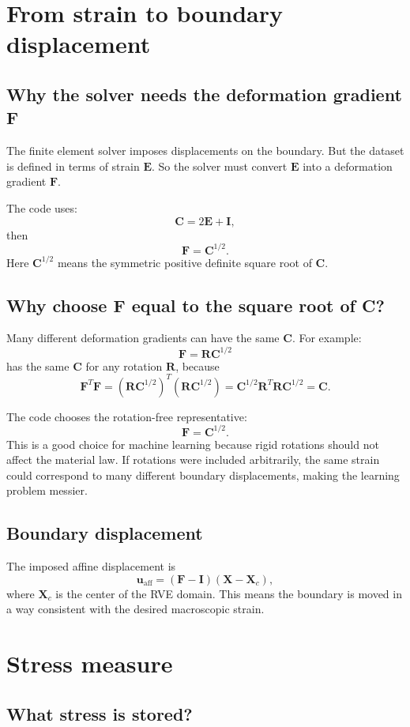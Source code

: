 \documentclass[11pt]{article}
\newcommand{\E}{\bm{E}}
\newcommand{\F}{\bm{F}}
\newcommand{\C}{\bm{C}}
\newcommand{\I}{\bm{I}}
\newcommand{\X}{\bm{X}}
\newcommand{\uvec}{\bm{u}}
\begin{document}
\section{From strain to boundary displacement}

\subsection{Why the solver needs the deformation gradient F}

The finite element solver imposes displacements on the boundary. But the dataset
is defined in terms of strain $\E$. So the solver must convert $\E$ into a
deformation gradient $\F$.

The code uses:
\[
  \C = 2\E + \I,
\]
then
\[
  \F = \C^{1/2}.
\]
Here $\C^{1/2}$ means the symmetric positive definite square root of $\C$.

\subsection{Why choose F equal to the square root of C?}

Many different deformation gradients can have the same $\C$. For example:
\[
  \F = \bm{R}\C^{1/2}
\]
has the same $\C$ for any rotation $\bm{R}$, because
\[
  \F^T\F
  =
  (\bm{R}\C^{1/2})^T(\bm{R}\C^{1/2})
  =
  \C^{1/2}\bm{R}^T\bm{R}\C^{1/2}
  =
  \C.
\]

The code chooses the rotation-free representative:
\[
  \F = \C^{1/2}.
\]
This is a good choice for machine learning because rigid rotations should not
affect the material law. If rotations were included arbitrarily, the same strain
could correspond to many different boundary displacements, making the learning
problem messier.

\subsection{Boundary displacement}

The imposed affine displacement is
\[
  \uvec_{\mathrm{aff}} = (\F-\I)(\X-\X_c),
\]
where $\X_c$ is the center of the RVE domain. This means the boundary is moved in
a way consistent with the desired macroscopic strain.

\section{Stress measure}

\subsection{What stress is stored?}
\end{document}
